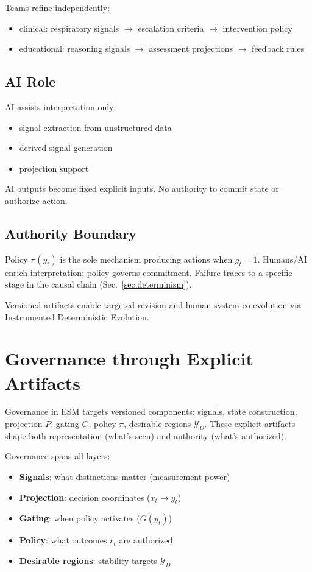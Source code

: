 \documentclass[11pt]{article}
\begin{document}
Teams refine independently:
\begin{itemize}
\item clinical: respiratory signals $\to$ escalation criteria $\to$ intervention policy
\item educational: reasoning signals $\to$ assessment projections $\to$ feedback rules
\end{itemize}

\subsection{AI Role}
AI assists interpretation only:
\begin{itemize}
\item signal extraction from unstructured data
\item derived signal generation  
\item projection support
\end{itemize}

AI outputs become fixed explicit inputs. No authority to commit state or authorize action.

\subsection{Authority Boundary}
Policy $\pi(y_t)$ is the sole mechanism producing actions when $g_t = 1$. Humans/AI enrich interpretation; policy governs commitment. Failure traces to a specific stage in the causal chain (Sec.~\ref{sec:determinism}).

Versioned artifacts enable targeted revision and human-system co-evolution via Instrumented Deterministic Evolution.


\section{Governance through Explicit Artifacts}

Governance in ESM targets versioned components: signals, state construction, projection $P$, gating $G$, policy $\pi$, desirable regions $\mathcal{Y}_D$. These explicit artifacts shape both representation (what's seen) and authority (what's authorized).

Governance spans all layers:
\begin{itemize}
\item \textbf{Signals}: what distinctions matter (measurement power)
\item \textbf{Projection}: decision coordinates ($x_t \to y_t$) 
\item \textbf{Gating}: when policy activates ($G(y_t)$)
\item \textbf{Policy}: what outcomes $r_t$ are authorized
\item \textbf{Desirable regions}: stability targets $\mathcal{Y}_D$
\end{itemize}
\end{document}
